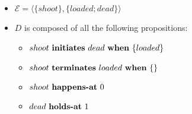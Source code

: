 \begin{itemize}
  \item $\mathcal{E}=\langle \{shoot\},\{loaded;dead\}\rangle$
  \item $D$ is composed of all the following propositions:
  \begin{itemize}
    \item $shoot \text{ \textbf{initiates} } dead \text{ \textbf{when} } \{loaded\}$
    \item $shoot \text{ \textbf{terminates} } loaded \text{ \textbf{when} } \{\}$
    \item $shoot \text{ \textbf{happens-at} } 0$
    \item $dead \text{ \textbf{holds-at} } 1$
  \end{itemize}
\end{itemize}
